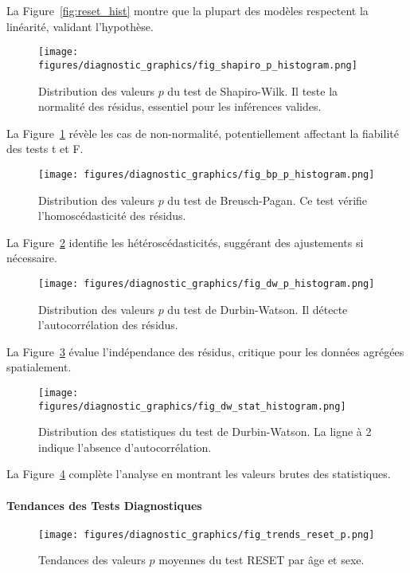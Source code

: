 La Figure~\ref{fig:reset_hist} montre que la plupart des modèles respectent la linéarité, validant l'hypothèse.

\begin{figure}[H]
	\centering
	\texttt{[image: figures/diagnostic\_graphics/fig\_shapiro\_p\_histogram.png]}
	\caption{Distribution des valeurs $p$ du test de Shapiro-Wilk. Il teste la normalité des résidus, essentiel pour les inférences valides.}
	\label{fig:shapiro_hist}
\end{figure}

La Figure~\ref{fig:shapiro_hist} révèle les cas de non-normalité, potentiellement affectant la fiabilité des tests t et F.

\begin{figure}[H]
	\centering
	\texttt{[image: figures/diagnostic\_graphics/fig\_bp\_p\_histogram.png]}
	\caption{Distribution des valeurs $p$ du test de Breusch-Pagan. Ce test vérifie l'homoscédasticité des résidus.}
	\label{fig:bp_hist}
\end{figure}

La Figure~\ref{fig:bp_hist} identifie les hétéroscédasticités, suggérant des ajustements si nécessaire.

\begin{figure}[H]
	\centering
	\texttt{[image: figures/diagnostic\_graphics/fig\_dw\_p\_histogram.png]}
	\caption{Distribution des valeurs $p$ du test de Durbin-Watson. Il détecte l'autocorrélation des résidus.}
	\label{fig:dw_hist}
\end{figure}

La Figure~\ref{fig:dw_hist} évalue l'indépendance des résidus, critique pour les données agrégées spatialement.

\begin{figure}[H]
	\centering
	\texttt{[image: figures/diagnostic\_graphics/fig\_dw\_stat\_histogram.png]}
	\caption{Distribution des statistiques du test de Durbin-Watson. La ligne à 2 indique l'absence d'autocorrélation.}
	\label{fig:dw_stat}
\end{figure}

La Figure~\ref{fig:dw_stat} complète l'analyse en montrant les valeurs brutes des statistiques.

\paragraph{Tendances des Tests Diagnostiques}

\begin{figure}[H]
	\centering
	\texttt{[image: figures/diagnostic\_graphics/fig\_trends\_reset\_p.png]}
	\caption{Tendances des valeurs $p$ moyennes du test RESET par âge et sexe.}
	\label{fig:trends_reset}
\end{figure}

